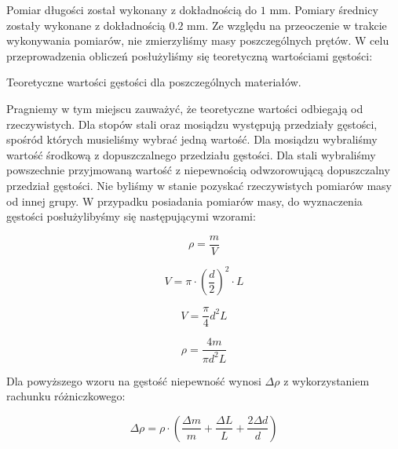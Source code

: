 \documentclass[polish, a4paper]{article}
\begin{document}
Pomiar długości został wykonany z dokładnością do $1$ mm. Pomiary średnicy zostały wykonane z dokładnością $0.2$ mm. Ze względu na przeoczenie w trakcie wykonywania pomiarów, nie zmierzyliśmy masy poszczególnych prętów. W celu przeprowadzenia obliczeń posłużyliśmy się teoretyczną wartościami gęstości:

\begin{table}[H]
    \centering
    \caption{Teoretyczne wartości gęstości dla poszczególnych materiałów.}
\end{table}

Pragniemy w tym miejscu zauważyć, że teoretyczne wartości odbiegają od rzeczywistych. Dla stopów stali oraz mosiądzu występują przedziały gęstości, spośród których musieliśmy wybrać jedną wartość. Dla mosiądzu wybraliśmy wartość środkową z dopuszczalnego przedziału gęstości. Dla stali wybraliśmy powszechnie przyjmowaną wartość z niepewnością odwzorowującą dopuszczalny przedział gęstości. Nie byliśmy w stanie pozyskać rzeczywistych pomiarów masy od innej grupy. W przypadku posiadania pomiarów masy, do wyznaczenia gęstości posłużylibyśmy się następującymi wzorami:

\begin{equation}
\rho = \frac{m}{V}
\end{equation}


\begin{equation}
V = \pi \cdot (\frac{d}{2})^2 \cdot L
\end{equation}

\begin{equation}
V = \frac{\pi}{4} d^2 L
\end{equation}

\begin{equation}
\rho = \frac{4m}{\pi d^2 L}
\end{equation}

Dla powyższego wzoru na gęstość niepewność wynosi $\Delta \rho$ z wykorzystaniem rachunku różniczkowego:

\begin{equation}
\Delta \rho = \rho \cdot ( \frac{\Delta m}{m} + \frac{\Delta L}{L} + \frac{2\Delta d}{d})
\end{equation}
\end{document}
